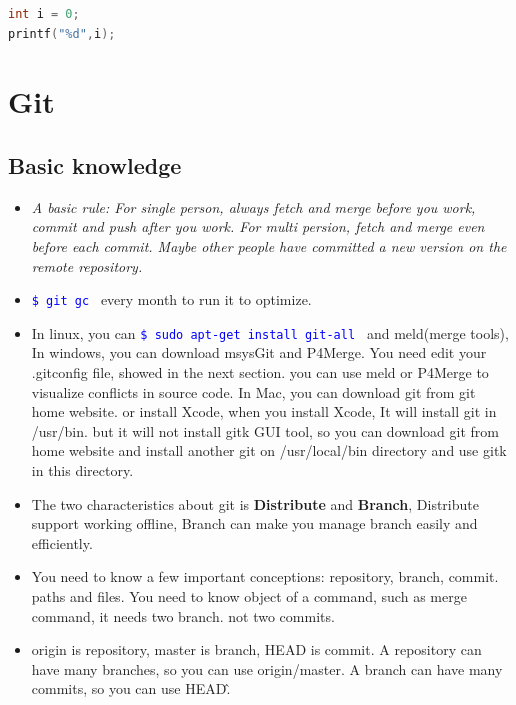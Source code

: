 \documentclass[a4paper,12pt,twoside]{book}
\newcommand{\linuxcommand}[1]{\texttt{\textcolor{blue}{\$ #1 \Pisymbol{psy}{191}}}}
\begin{document}
\begin{lstlisting}[frame=single, language=c]  % Start your code-block
int i = 0;
printf("%d",i);
\end{lstlisting}

\section{Git}

\subsection{ Basic knowledge}
\begin{itemize}
\item \emph{A basic rule:  For single person, always fetch and merge before you work,  commit and push
    after you work.  For multi persion, fetch and merge even before each commit.  Maybe other people have
    committed a new version on the remote repository. }

 \item \linuxcommand{git gc} every month to run it to optimize.

 \item In linux, you can \linuxcommand{sudo apt-get install git-all} and meld(merge tools), In windows, you can download
     msysGit and P4Merge. You need edit your .gitconfig file, showed in the next section. you can use meld or
     P4Merge to visualize conflicts in source code. In Mac, you can download git from git home website. or install Xcode, when you install Xcode, It will install git in /usr/bin. but it will not install gitk GUI tool, so you can download git from home website and install another git on /usr/local/bin directory and use gitk in this directory. 

\item The two characteristics about git is \textbf{Distribute} and \textbf{Branch}, Distribute support working
    offline, Branch can make you manage branch easily and efficiently.

\item You need to know a few important conceptions: repository, branch, commit.  paths and files. You need to
    know object of a command, such as merge command, it needs two branch. not two commits. 
   

    \item origin is repository, master is branch, HEAD is commit. A repository can have many branches, so you can use origin/master. A branch can have many commits, so you can use HEAD\^ . 
    

\end{itemize}
\end{document}
